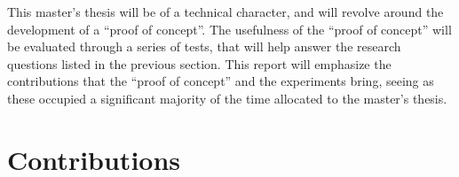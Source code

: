 \begin{comment}
What methodology will you apply to address the goals: theoretic/analytic, model/abstraction or design/experiment?
This section will describe the research methodology applied and the reason for this choice of research methodology.
You should return to the actual choices made in the work and the alternatives in the Discussion chapter.
\end{comment}

This master's thesis will be of a technical character, and will revolve around the development of a \enquote{proof of concept}. The usefulness of the \enquote{proof of concept} will be evaluated through a series of tests, that will help answer the research questions listed in the previous section. This report will emphasize the contributions that the \enquote{proof of concept} and the experiments bring, seeing as these occupied a significant majority of the time allocated to the master's thesis.


\section{Contributions}
\label{sec:intro-contributions}

\begin{comment}
This section just provides a brief summary of the main contributions of the work.
The main description of the contributions will come in Section~\ref{sec:contributions}, after the results are presented.
(Hence Section~\ref{sec:introContributions} can also be left out, leaving the discussion completely to Section~\ref{sec:contributions}.)

The format of this section will generally be as follows:

\begin{enumerate}
    \item \textit{Lorem ipsum dolor sit amet, consectetur adipiscing elit.}
    \item \textit{Lorem ipsum dolor sit amet, consectetur adipiscing elit.}
    \item \textit{Lorem ipsum dolor sit amet, consectetur adipiscing elit.}
\end{enumerate}

\noindent
where the items on the list briefly describe the key contributions.

The order of the contributions here is important. List your main contribution first!
Creating this list will help you not only with writing the Conclusion (where all items listed here definitely should be included, and in more detail),
but also with items that need to be mentioned in the Abstract, as well as with points that you will want to bring to attention in the Discussion.
Hence most of the content on this list will be addressed 4--5 times in your text: here, in the Abstract, Discussion, Conclusion, and (most likely)
in the Results chapter.
\end{comment}

